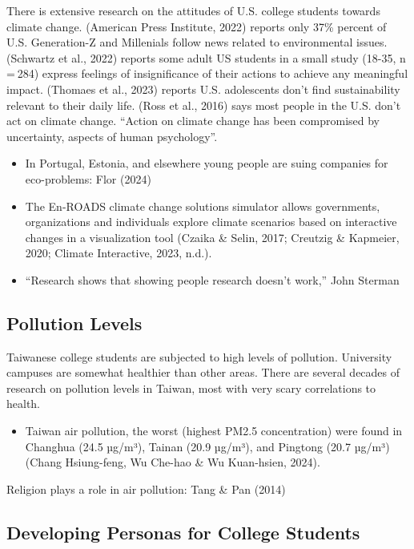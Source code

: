 \documentclass[
  letterpaper,
  DIV=11,
  numbers=noendperiod]{scrartcl}
\providecommand{\tightlist}{%
  \setlength{\itemsep}{0pt}\setlength{\parskip}{0pt}}\usepackage{longtable,booktabs,array}
\begin{document}
There is extensive research on the attitudes of U.S. college students
towards climate change. (American Press Institute, 2022) reports only
37\% percent of U.S. Generation-Z and Millenials follow news related to
environmental issues. (Schwartz et al., 2022) reports some adult US
students in a small study (18-35, n = 284) express feelings of
insignificance of their actions to achieve any meaningful impact.
(Thomaes et al., 2023) reports U.S. adolescents don't find
sustainability relevant to their daily life. (Ross et al., 2016) says
most people in the U.S. don't act on climate change. ``Action on climate
change has been compromised by uncertainty, aspects of human
psychology''.

\begin{itemize}
\item
  In Portugal, Estonia, and elsewhere young people are suing companies
  for eco-problems: Flor (2024)
\item
  The En-ROADS climate change solutions simulator allows governments,
  organizations and individuals explore climate scenarios based on
  interactive changes in a visualization tool (Czaika \& Selin, 2017;
  Creutzig \& Kapmeier, 2020; Climate Interactive, 2023, n.d.).
\item
  ``Research shows that showing people research doesn't work,'' John
  Sterman
\end{itemize}

\subsection{Pollution Levels}\label{pollution-levels}

Taiwanese college students are subjected to high levels of pollution.
University campuses are somewhat healthier than other areas. There are
several decades of research on pollution levels in Taiwan, most with
very scary correlations to health.

\begin{itemize}
\tightlist
\item
  Taiwan air pollution, the worst (highest PM2.5 concentration) were
  found in Changhua (24.5 µg/m³), Tainan (20.9 µg/m³), and Pingtong
  (20.7 µg/m³) (Chang Hsiung-feng, Wu Che-hao \& Wu Kuan-hsien, 2024).
\end{itemize}

Religion plays a role in air pollution: Tang \& Pan (2014)

\subsection{Developing Personas for College
Students}\label{developing-personas-for-college-students}
\end{document}
